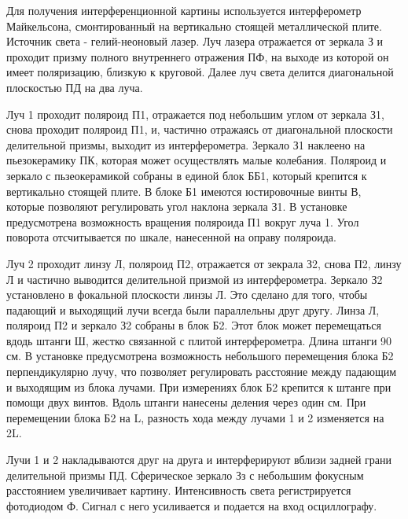 \documentclass[a4paper, 12pt]{article}
\begin{document}
    Для получения интерференционной картины используется интерферометр Майкельсона, смонтированный на вертикально стоящей металлической плите. Источник света - гелий-неоновый лазер. 
Луч лазера отражается от зеркала З и проходит призму полного внутреннего отражения ПФ, на выходе из которой он имеет поляризацию, близкую к круговой. Далее луч света делится диагональной плоскостью
ПД на два луча.

Луч 1 проходит поляроид П1, отражается под небольшим углом от зеркала З1, снова проходит поляроид П1, и, частично отражаясь от диагональной плоскости делительной призмы, выходит из интерферометра.
Зеркало З1 наклеено на пьезокерамику ПК, которая может осуществлять малые колебания. Поляроид и зеркало с пьзеокерамикой собраны в единой блок ББ1, который крепится к вертикально стоящей плите.
В блоке Б1 имеются юстировочные винты В, которые позволяют регулировать угол наклона зеркала З1. В установке предусмотрена возможность вращения поляроида П1 вокруг луча 1. Угол поворота
отсчитывается по шкале, нанесенной на оправу поляроида.

Луч 2 проходит линзу Л, поляроид П2, отражается от зекрала З2, снова П2, линзу Л и частично выводится делительной призмой из интерферометра. Зеркало З2 установлено в фокальной плоскости линзы
Л. Это сделано для того, чтобы падающий и выходящий лучи всегда были параллельны друг другу. Линза Л, поляроид П2 и зеркало З2 собраны в блок Б2. Этот блок может перемещаться вдодь штанги Ш,
жестко связанной с плитой интерферометра. Длина штанги 90 см. В установке предусмотрена возможность небольшого перемещения блока Б2 перпендикулярно лучу, что позволяет регулировать расстояние между
падающим и выходящим из блока лучами. При измерениях блок Б2 крепится к штанге при помощи двух винтов. Вдоль штанги нанесены деления через один см. При перемещении блока Б2 на L, разность хода 
между лучами 1 и 2 изменяется на 2L.

Лучи 1 и 2 накладываются друг на друга и интерферируют вблизи задней грани делительной призмы ПД. Сферическое зеркало Зз с небольшим фокусным расстоянием увеличивает картину. Интенсивность света
регистрируется фотодиодом Ф. Сигнал с него усиливается и подается на вход осциллографу.
\end{document}
